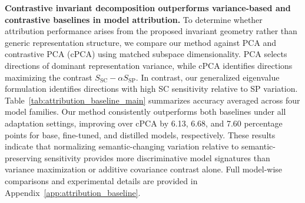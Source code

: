 \textbf{Contrastive invariant decomposition outperforms variance-based and contrastive baselines in model attribution.}
To determine whether attribution performance arises from the proposed invariant geometry rather than generic representation structure, we compare our method against PCA and contrastive PCA (cPCA) using matched subspace dimensionality. PCA selects directions of dominant representation variance, while cPCA identifies directions maximizing the contrast $S_{\mathrm{SC}}-\alpha S_{\mathrm{SP}}$. In contrast, our generalized eigenvalue formulation identifies directions with high SC sensitivity relative to SP variation. Table~\ref{tab:attribution_baseline_main} summarizes accuracy averaged across four model families. Our method consistently outperforms both baselines under all adaptation settings, improving over cPCA by 6.13, 6.68, and 7.60 percentage points for base, fine-tuned, and distilled models, respectively. These results indicate that normalizing semantic-changing variation relative to semantic-preserving sensitivity provides more discriminative model signatures than variance maximization or additive covariance contrast alone. Full model-wise comparisons and experimental details are provided in Appendix~\ref{app:attribution_baseline}.




